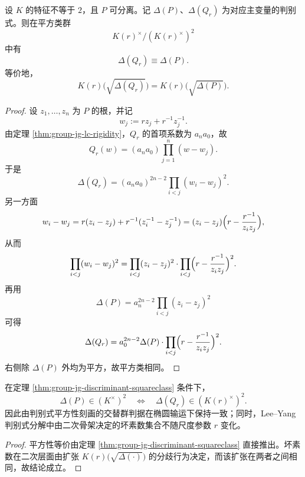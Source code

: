 \begin{theorem}[判别式平方类守恒]\label{thm:group-jg-discriminant-squareclass}
设 \(K\) 的特征不等于 \(2\)，且 \(P\) 可分离。记 \(\Delta(P)\)、\(\Delta(Q_r)\) 为对应主变量的判别式。则在平方类群
\[
K(r)^\times/(K(r)^\times)^2
\]
中有
\[
\Delta(Q_r)\equiv \Delta(P).
\]
等价地，
\[
K(r)\bigl(\sqrt{\Delta(Q_r)}\bigr)=K(r)\bigl(\sqrt{\Delta(P)}\bigr).
\]
\end{theorem}
\begin{proof}
设 \(z_1,\dots,z_n\) 为 \(P\) 的根，并记
\[
w_j:=r z_j+r^{-1}z_j^{-1}.
\]
由定理 \ref{thm:group-jg-lc-rigidity}，\(Q_r\) 的首项系数为 \(a_n a_0\)，故
\[
Q_r(w)=(a_n a_0)\prod_{j=1}^{n}(w-w_j).
\]
于是
\[
\Delta(Q_r)=(a_n a_0)^{2n-2}\prod_{i<j}(w_i-w_j)^2.
\]
另一方面
\[
w_i-w_j
=r(z_i-z_j)+r^{-1}(z_i^{-1}-z_j^{-1})
=(z_i-z_j)\Bigl(r-\frac{r^{-1}}{z_i z_j}\Bigr),
\]
从而
\[
\prod_{i<j}(w_i-w_j)^2
=\prod_{i<j}(z_i-z_j)^2
\cdot
\prod_{i<j}\Bigl(r-\frac{r^{-1}}{z_i z_j}\Bigr)^2.
\]
再用
\[
\Delta(P)=a_n^{2n-2}\prod_{i<j}(z_i-z_j)^2
\]
可得
\[
\Delta(Q_r)=a_0^{2n-2}\Delta(P)\cdot
\prod_{i<j}\Bigl(r-\frac{r^{-1}}{z_i z_j}\Bigr)^2.
\]
右侧除 \(\Delta(P)\) 外均为平方，故平方类相同。
\end{proof}

\begin{corollary}\label{cor:group-jg-alt-criterion-stability}
在定理 \ref{thm:group-jg-discriminant-squareclass} 条件下，
\[
\Delta(P)\in (K^\times)^2
\quad\Longleftrightarrow\quad
\Delta(Q_r)\in (K(r)^\times)^2.
\]
因此由判别式平方性刻画的交替群判据在椭圆输运下保持一致；同时，Lee--Yang 判别式分解中由二次骨架决定的坏素数集合不随尺度参数 \(r\) 变化。
\end{corollary}
\begin{proof}
平方性等价由定理 \ref{thm:group-jg-discriminant-squareclass} 直接推出。坏素数在二次层面由扩张
\(
K(r)\bigl(\sqrt{\Delta(\cdot)}\bigr)
\)
的分歧行为决定，而该扩张在两者之间相同，故结论成立。
\end{proof}

